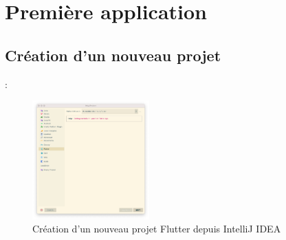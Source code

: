 \documentclass[10pt]{beamer}
\begin{document}
\section{Première application}
\subsection{Création d'un nouveau projet}
\begin{frame}[fragile,t]{\secname : \subsecname}
    \begin{figure}[H]
        \begin{center}
            \includegraphics[width=0.4\textwidth]{../assets/img/new-project-1.jpg}
            \caption*{Création d'un nouveau projet Flutter depuis IntelliJ IDEA}
            \label{Fig:new-project-1}
        \end{center}
    \end{figure}
\end{frame}
\end{document}
